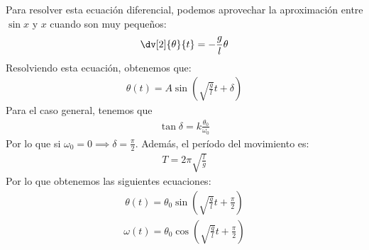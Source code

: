 \documentclass{article}
\begin{document}
    Para resolver esta ecuación diferencial, podemos aprovechar la aproximación entre $\sin x$ y
    $x$ cuando son muy pequeños:
    \begin{equation}
        \begin{split}
            \dv[2]{\theta }{t} = -\frac{g}{l}\theta 
        \end{split}
    \end{equation}
    Resolviendo esta ecuación, obtenemos que:
    \begin{equation}
        \begin{split}
            \theta (t) = A \sin (\sqrt{\frac{g}{l}}t + \delta )
        \end{split}
    \end{equation}
    Para el caso general, tenemos que
    \begin{equation}
        \begin{split}
            \tan \delta = k \frac{\theta _{0}}{\omega_{0}}
        \end{split}
    \end{equation}
    Por lo que si $\omega _{0}=0 \implies \delta = \frac{\pi}{2}$.
    Además, el período del movimiento es:
    \begin{equation}
        \begin{split}
            T = 2\pi \sqrt{\frac{l}{g}}
        \end{split}
    \end{equation}
    Por lo que obtenemos las siguientes ecuaciones:
    \begin{equation}
        \begin{split}
            \theta (t)= \theta_{0} \sin ( \sqrt{\frac{g}{l}}t + \frac{\pi}{2})
        \end{split}
    \end{equation}
    \begin{equation}
        \begin{split}
            \omega (t)= \theta _{0} \cos (\sqrt{\frac{g}{l}}t + \frac{\pi}{2})
        \end{split}
    \end{equation}
\end{document}
